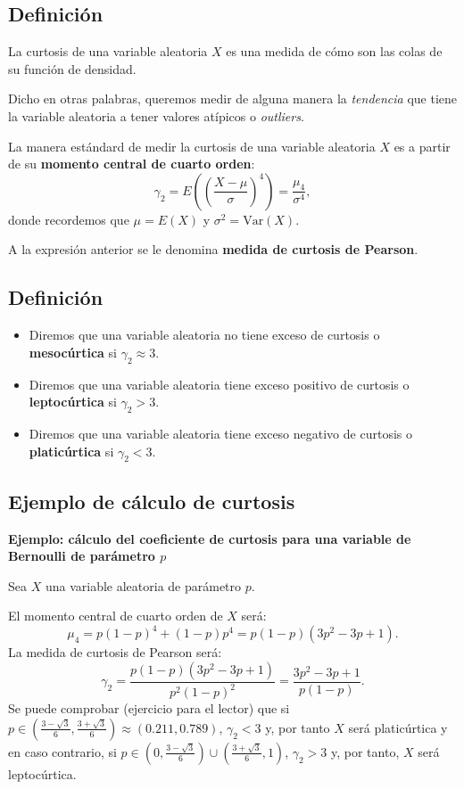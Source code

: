 \documentclass[]{book}
\begin{document}
\hypertarget{definiciuxf3n-2}{%
\subsection{Definición}\label{definiciuxf3n-2}}

La curtosis de una variable aleatoria \(X\) es una medida de cómo son las colas de su función de densidad.

Dicho en otras palabras, queremos medir de alguna manera la \emph{tendencia} que tiene la variable aleatoria a tener valores atípicos o \emph{outliers}.

La manera estándard de medir la curtosis de una variable aleatoria \(X\) es a partir de su \textbf{momento central de cuarto orden}:
\[
\gamma_2 = E\left(\left(\frac{X-\mu}{\sigma}\right)^4\right) = \frac{\mu_4}{\sigma^4},
\]
donde recordemos que \(\mu=E(X)\) y \(\sigma^2 =\mathrm{Var}(X)\).

A la expresión anterior se le denomina \textbf{medida de curtosis de Pearson}.

\hypertarget{definiciuxf3n-3}{%
\subsection{Definición}\label{definiciuxf3n-3}}

\begin{itemize}
\item
  Diremos que una variable aleatoria no tiene exceso de curtosis o \textbf{mesocúrtica} si \(\gamma_2 \approx 3\).
\item
  Diremos que una variable aleatoria tiene exceso positivo de curtosis o \textbf{leptocúrtica} si \(\gamma_2 >3\).
\item
  Diremos que una variable aleatoria tiene exceso negativo de curtosis o \textbf{platicúrtica} si \(\gamma_2 <3\).
\end{itemize}

\hypertarget{ejemplo-de-cuxe1lculo-de-curtosis}{%
\subsection{Ejemplo de cálculo de curtosis}\label{ejemplo-de-cuxe1lculo-de-curtosis}}

\textbf{Ejemplo: cálculo del coeficiente de curtosis para una variable de Bernoulli de parámetro \(p\)}

Sea \(X\) una variable aleatoria de parámetro \(p\).

El momento central de cuarto orden de \(X\) será:
\[
\mu_4 = p (1-p)^4 +(1-p)p^4 = p (1-p) (3 p^2-3p+1).
\]
La medida de curtosis de Pearson será:
\[
\gamma_2 = \frac{p (1-p) (3 p^2-3p+1)}{p^2 (1-p)^2} = \frac{3 p^2-3p+1}{p(1-p)}.
\]
Se puede comprobar (ejercicio para el lector) que si \(p\in \left(\frac{3-\sqrt{3}}{6},\frac{3+\sqrt{3}}{6}\right)\approx (0.211,0.789)\), \(\gamma_2 <3\) y, por tanto \(X\) será platicúrtica y en caso contrario, si \(p\in \left(0,\frac{3-\sqrt{3}}{6}\right)\cup \left(\frac{3+\sqrt{3}}{6},1\right)\), \(\gamma_2 >3\) y, por tanto, \(X\) será leptocúrtica.
\end{document}

